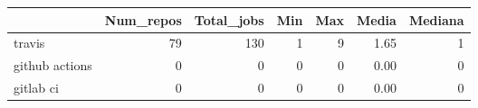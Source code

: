 \begin{tabular}{lrrrrrr}
\toprule
{} &  Num\_repos &  Total\_jobs &  Min &  Max &  Media &  Mediana \\
\midrule
travis         &         79 &         130 &    1 &    9 &   1.65 &        1 \\
github actions &          0 &           0 &    0 &    0 &   0.00 &        0 \\
gitlab ci      &          0 &           0 &    0 &    0 &   0.00 &        0 \\
\bottomrule
\end{tabular}
